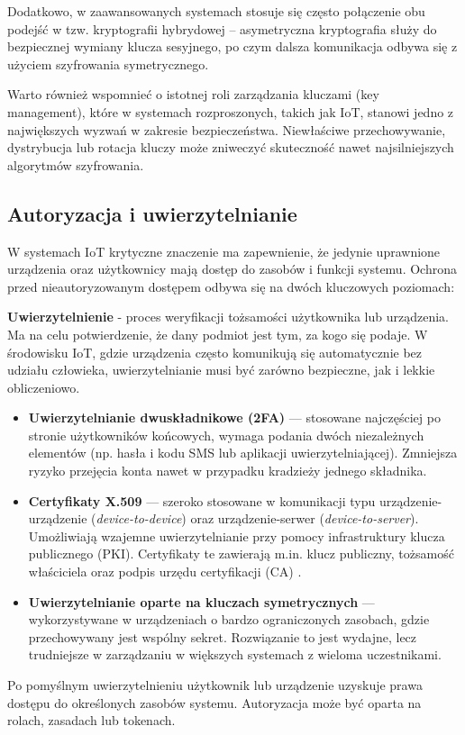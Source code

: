 Dodatkowo, w zaawansowanych systemach stosuje się często połączenie obu podejść w tzw. kryptografii hybrydowej – asymetryczna kryptografia służy do bezpiecznej wymiany klucza sesyjnego, po czym dalsza komunikacja odbywa się z użyciem szyfrowania symetrycznego.

Warto również wspomnieć o istotnej roli zarządzania kluczami (key management), które w systemach rozproszonych, takich jak IoT, stanowi jedno z największych wyzwań w zakresie bezpieczeństwa. Niewłaściwe przechowywanie, dystrybucja lub rotacja kluczy może zniweczyć skuteczność nawet najsilniejszych algorytmów szyfrowania.

\subsection{Autoryzacja i uwierzytelnianie}
W systemach IoT krytyczne znaczenie ma zapewnienie, że jedynie uprawnione urządzenia oraz użytkownicy mają dostęp do zasobów i funkcji systemu. Ochrona przed nieautoryzowanym dostępem odbywa się na dwóch kluczowych poziomach:

\textbf{Uwierzytelnienie} - proces weryfikacji tożsamości użytkownika lub urządzenia. Ma na celu potwierdzenie, że dany podmiot jest tym, za kogo się podaje.
W środowisku IoT, gdzie urządzenia często komunikują się automatycznie bez udziału człowieka, uwierzytelnianie musi być zarówno bezpieczne, jak i lekkie obliczeniowo.
\begin{itemize}
    \item \textbf{Uwierzytelnianie dwuskładnikowe (2FA)} — stosowane najczęściej po stronie użytkowników końcowych, wymaga podania dwóch niezależnych elementów (np. hasła i kodu SMS lub aplikacji uwierzytelniającej). Zmniejsza ryzyko przejęcia konta nawet w przypadku kradzieży jednego składnika.
    
    \item \textbf{Certyfikaty X.509} — szeroko stosowane w komunikacji typu urządzenie-urządzenie (\textit{device-to-device}) oraz urządzenie-serwer (\textit{device-to-server}). Umożliwiają wzajemne uwierzytelnianie przy pomocy infrastruktury klucza publicznego (PKI). Certyfikaty te zawierają m.in. klucz publiczny, tożsamość właściciela oraz podpis urzędu certyfikacji (CA) \cite{stallings2017cryptography}.
    
    \item \textbf{Uwierzytelnianie oparte na kluczach symetrycznych} — wykorzystywane w urządzeniach o bardzo ograniczonych zasobach, gdzie przechowywany jest wspólny sekret. Rozwiązanie to jest wydajne, lecz trudniejsze w zarządzaniu w większych systemach z wieloma uczestnikami.
\end{itemize}
Po pomyślnym uwierzytelnieniu użytkownik lub urządzenie uzyskuje prawa dostępu do określonych zasobów systemu. Autoryzacja może być oparta na rolach, zasadach lub tokenach.

